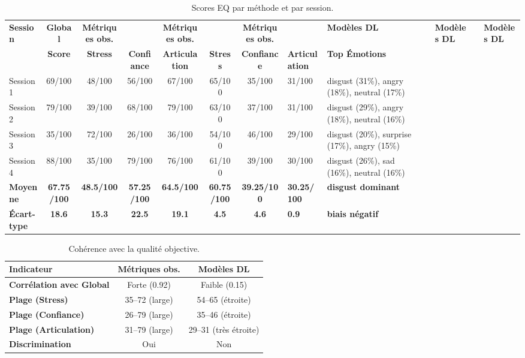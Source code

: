 \documentclass[12pt,a4paper]{article}
\begin{document}
\begin{table}[H]
    \centering
    \scriptsize
    \begin{tabularx}{\textwidth}{@{}lcccccc@{}}
        \toprule
        \textbf{Session} & \textbf{Global} & \textbf{Métriques obs.} & & \textbf{Métriques obs.} & & \textbf{Métriques obs.} & & \textbf{Modèles DL} & & \textbf{Modèles DL} & & \textbf{Modèles DL} & \\
        & \textbf{Score} & \textbf{Stress} & \textbf{Confiance} & \textbf{Articulation} & \textbf{Stress} & \textbf{Confiance} & \textbf{Articulation} & \textbf{Top Émotions} \\
        \midrule
        Session 1 & 69/100 & 48/100 & 56/100 & 67/100 & 65/100 & 35/100 & 31/100 & disgust (31\%), angry (18\%), neutral (17\%) \\
        Session 2 & 79/100 & 39/100 & 68/100 & 79/100 & 63/100 & 37/100 & 31/100 & disgust (29\%), angry (18\%), neutral (16\%) \\
        Session 3 & 35/100 & 72/100 & 26/100 & 36/100 & 54/100 & 46/100 & 29/100 & disgust (20\%), surprise (17\%), angry (15\%) \\
        Session 4 & 88/100 & 35/100 & 79/100 & 76/100 & 61/100 & 39/100 & 30/100 & disgust (26\%), sad (16\%), neutral (16\%) \\
        \midrule
        \textbf{Moyenne} & \textbf{67.75/100} & \textbf{48.5/100} & \textbf{57.25/100} & \textbf{64.5/100} & \textbf{60.75/100} & \textbf{39.25/100} & \textbf{30.25/100} & \textbf{disgust dominant} \\
        \textbf{Écart-type} & \textbf{18.6} & \textbf{15.3} & \textbf{22.5} & \textbf{19.1} & \textbf{4.5} & \textbf{4.6} & \textbf{0.9} & \textbf{biais négatif} \\
        \bottomrule
    \end{tabularx}
    \caption{Scores EQ par méthode et par session.}
\end{table}

\begin{table}[H]
    \centering
    \footnotesize
    \begin{tabularx}{\textwidth}{@{}lcc@{}}
        \toprule
        \textbf{Indicateur} & \textbf{Métriques obs.} & \textbf{Modèles DL} \\
        \midrule
        \textbf{Corrélation avec Global} & Forte (0.92) & Faible (0.15) \\
        \textbf{Plage (Stress)} & 35--72 (large) & 54--65 (étroite) \\
        \textbf{Plage (Confiance)} & 26--79 (large) & 35--46 (étroite) \\
        \textbf{Plage (Articulation)} & 31--79 (large) & 29--31 (très étroite) \\
        \textbf{Discrimination} & Oui & Non \\
        \bottomrule
    \end{tabularx}
    \caption{Cohérence avec la qualité objective.}
\end{table}
\end{document}
